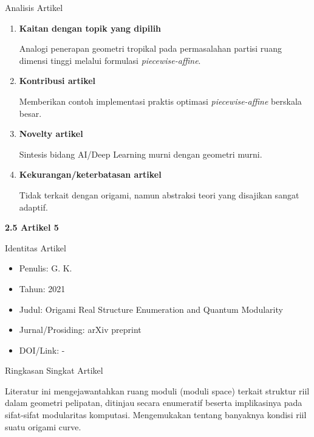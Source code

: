 \documentclass[12pt,a4paper]{article}
\begin{document}
\noindent Analisis Artikel
\begin{enumerate}
      \item \textbf{Kaitan dengan topik yang dipilih}\par
            Analogi penerapan geometri tropikal pada permasalahan partisi ruang dimensi tinggi melalui formulasi \textit{piecewise-affine}.
      \item \textbf{Kontribusi artikel}\par
            Memberikan contoh implementasi praktis optimasi \textit{piecewise-affine} berskala besar.
      \item \textbf{Novelty artikel}\par
            Sintesis bidang AI/Deep Learning murni dengan geometri murni.
      \item \textbf{Kekurangan/keterbatasan artikel}\par
            Tidak terkait dengan origami, namun abstraksi teori yang disajikan sangat adaptif.
\end{enumerate}

\newpage
\noindent\textbf{\large 2.5 Artikel 5 \cite{gk2021origami}}\par

\noindent Identitas Artikel
\begin{itemize}
      \item[-] Penulis: G. K.
      \item[-] Tahun: 2021
      \item[-] Judul: Origami Real Structure Enumeration and Quantum Modularity
      \item[-] Jurnal/Prosiding: arXiv preprint
      \item[-] DOI/Link: -
\end{itemize}


\noindent Ringkasan Singkat Artikel\par
Literatur ini mengejawantahkan ruang moduli (moduli space) terkait struktur riil dalam geometri pelipatan, ditinjau secara enumeratif beserta implikasinya pada sifat-sifat modularitas komputasi. Mengemukakan tentang banyaknya kondisi riil suatu origami curve.
\end{document}
